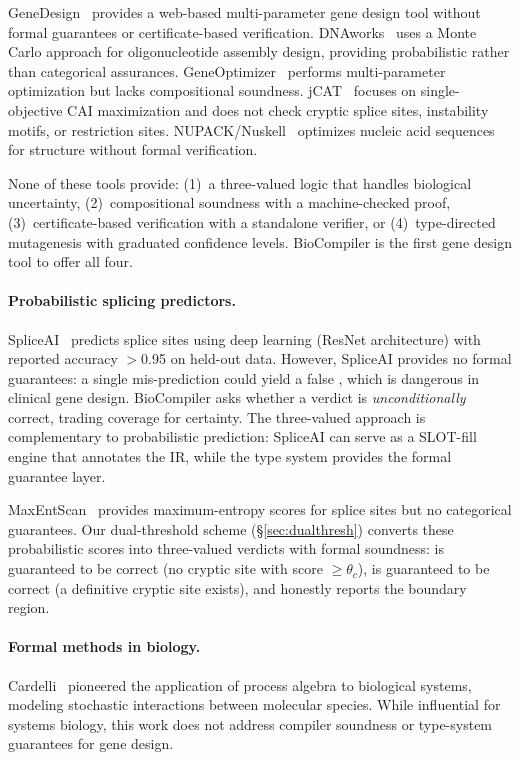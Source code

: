 GeneDesign~\cite{richardson2006genedesign} provides a web-based
multi-parameter gene design tool without formal guarantees or
certificate-based verification.  DNAworks~\cite{vandenbergh2015dnaworks}
uses a Monte Carlo approach for oligonucleotide assembly design,
providing probabilistic rather than categorical assurances.
GeneOptimizer~\cite{fath2011geneoptimizer} performs multi-parameter
optimization but lacks compositional soundness.
jCAT~\cite{gage2006jcat} focuses on single-objective CAI maximization
and does not check cryptic splice sites, instability motifs, or
restriction sites.  NUPACK/Nuskell~\cite{zadeh2011nupack} optimizes
nucleic acid sequences for structure without formal verification.

None of these tools provide: (1)~a three-valued logic that handles
biological uncertainty, (2)~compositional soundness with a machine-checked
proof, (3)~certificate-based verification with a standalone verifier, or
(4)~type-directed mutagenesis with graduated confidence levels.
BioCompiler is the first gene design tool to offer all four.

\paragraph{Probabilistic splicing predictors.}
SpliceAI~\cite{jaganathan2019spliceai} predicts splice sites using deep
learning (ResNet architecture) with reported accuracy $>$0.95 on held-out
data.  However, SpliceAI provides no formal guarantees: a single
mis-prediction could yield a false \PASS, which is dangerous in clinical
gene design.  BioCompiler asks whether a \PASS{} verdict is
\emph{unconditionally} correct, trading coverage for certainty.  The
three-valued approach is complementary to probabilistic prediction:
SpliceAI can serve as a SLOT-fill engine that annotates the IR, while
the type system provides the formal guarantee layer.

MaxEntScan~\cite{yarden2006maxentscan} provides maximum-entropy scores
for splice sites but no categorical guarantees.  Our dual-threshold
scheme (\S\ref{sec:dualthresh}) converts these probabilistic scores into
three-valued verdicts with formal soundness: \PASS{} is guaranteed to be
correct (no cryptic site with score $\ge \theta_c$), \FAIL{} is
guaranteed to be correct (a definitive cryptic site exists), and
\UNCERTAIN{} honestly reports the boundary region.

\paragraph{Formal methods in biology.}
Cardelli~\cite{cardelli2008process} pioneered the application of process
algebra to biological systems, modeling stochastic interactions between
molecular species.  While influential for systems biology, this work does
not address compiler soundness or type-system guarantees for gene design.

